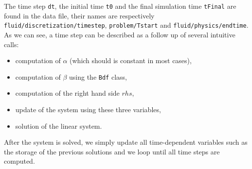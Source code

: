 The time step \verb!dt!, the initial time \verb!t0! and the final simulation time \verb!tFinal!
are found in the data file, their names are respectively  \verb!fluid/discretization/timestep!,
\verb!problem/Tstart! and \verb!fluid/physics/endtime!. As we can see, a time step can be described
as a follow up of several intuitive calls:
\begin{itemize}
\item computation of $\alpha$ (which should is constant in most cases),
\item computation of $\beta$ using the \verb!Bdf! class,
\item computation of the right hand side $rhs$,
\item update of the system using these three variables,
\item solution of the linear system.
\end{itemize}
After the system is solved, we simply update all time-dependent variables such as the storage
of the previous solutions and we loop until all time steps are computed.


%
%
